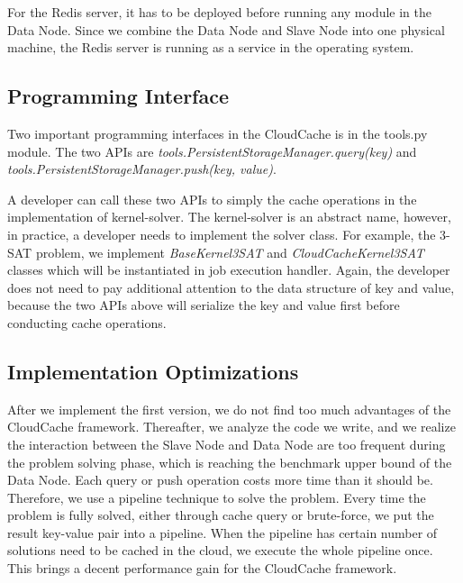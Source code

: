 For the Redis server, it has to be deployed before running any module in the Data Node. Since we combine the Data Node and Slave Node into one physical machine, the Redis server is running as a service in the operating system.

\subsection{Programming Interface}
Two important programming interfaces in the CloudCache is in the tools.py module. The two APIs are \emph{tools.PersistentStorageManager.query(key)} and \emph{tools.PersistentStorageManager.push(key, value)}. 

A developer can call these two APIs to simply the cache operations in the implementation of kernel-solver. The kernel-solver is an abstract name, however, in practice, a developer needs to implement the solver class. For example, the 3-SAT problem, we implement \emph{BaseKernel3SAT} and \emph{CloudCacheKernel3SAT} classes which will be instantiated in job execution handler. Again, the developer does not need to pay additional attention to the data structure of key and value, because the two APIs above will serialize the key and value first before conducting cache operations.

\subsection{Implementation Optimizations}
After we implement the first version, we do not find too much advantages of the CloudCache framework. Thereafter, we analyze the code we write, and we realize the interaction between the Slave Node and Data Node are too frequent during the problem solving phase, which is reaching the benchmark upper bound of the Data Node. Each query or push operation costs more time than it should be. Therefore, we use a pipeline technique to solve the problem. Every time the problem is fully solved, either through cache query or brute-force, we put the result key-value pair into a pipeline. When the pipeline has certain number of solutions need to be cached in the cloud, we execute the whole pipeline once. This brings a decent performance gain for the CloudCache framework.
